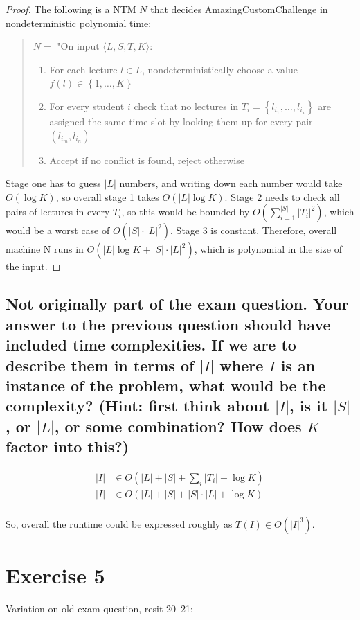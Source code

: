 \documentclass[a4paper,11pt]{article}
\newcommand{\set}[1]{\left\{ #1 \right\}}
\begin{document}
	\begin{proof}
		The following is a NTM $N$ that decides AmazingCustomChallenge in nondeterministic polynomial time:
		\begin{quote}
			$N=$ "On input $\langle L,S,T,K\rangle$:
			\begin{enumerate}
				\item For each lecture $l\in L$, nondeterministically choose a value $f(l)\in\set{1,\dots,K}$
				\item For every student $i$ check that no lectures in $T_i=\set{l_{i_1},\dots,l_{i_x}}$ are assigned the same time-slot by looking them up for every pair $(l_{i_m},l_{i_n})$
				\item Accept if no conflict is found, reject otherwise
			\end{enumerate}
		\end{quote}
		Stage one has to guess $|L|$ numbers, and writing down each number would take $O(\log K)$, so overall stage 1 takes $O(|L|\log K)$. Stage 2 needs to check all pairs of lectures in every $T_i$, so this would be bounded by $O(\sum_{i=1}^{|S|}|T_i|^2)$, which would be a worst case of $O(|S|\cdot |L|^2)$. Stage 3 is constant. Therefore, overall machine N runs in $O(|L|\log K + |S|\cdot|L|^2)$, which is polynomial in the size of the input.
	\end{proof}

	\subsection{Not originally part of the exam question. Your answer to the previous question should have included time complexities. If we are to describe them in terms of $|I|$ where $I$ is an instance of the problem, what would be the complexity? (Hint: first think about $|I|$, is it $|S|$, or $|L|$, or some combination? How does $K$ factor into this?)}

	\begin{align*}
		|I| &\in O(|L|+|S|+\sum_{i}|T_i|+\log K)\\
		|I| &\in O(|L|+|S| + |S|\cdot|L| + \log K)\\
	\end{align*}

	So, overall the runtime could be expressed roughly as $T(I)\in O(|I|^3)$.

	\section{Exercise 5}
	Variation on old exam question, resit 20--21:
\end{document}
